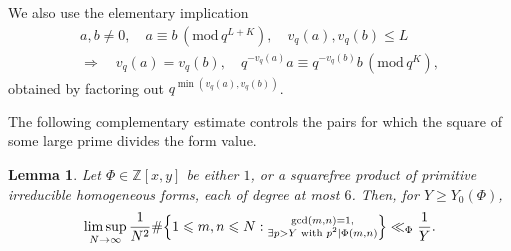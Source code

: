 \documentclass[12pt,reqno]{amsart}
\numberwithin{equation}{section}
\newtheorem{lemma}[theorem]{Lemma}
\theoremstyle{definition}
\renewcommand{\le}{\leqslant}
\renewcommand{\ge}{\geqslant}
\newcommand{\ZZ}{\mathbb{Z}}
\renewcommand{\pmod}[1]{\,(\mathrm{mod}\,#1)}
\begin{document}
We also use the elementary implication
\begin{equation}\label{eq:asy-valuations}
\begin{gathered}
a,b\ne0,\quad
a\equiv b \pmod{q^{L+K}}, \quad v_q(a),v_q(b)\le L\\
\Longrightarrow\quad
v_q(a)=v_q(b), \quad
q^{-v_q(a)}a\equiv q^{-v_q(b)}b \pmod{q^K},
\end{gathered}
\end{equation}
obtained by factoring out $q^{\min(v_q(a),v_q(b))}$.

The following complementary estimate controls the pairs for which the square of some large prime divides the form value.

\begin{lemma}\label{lem:asy-large-squares}
Let $\Phi\in \ZZ[x,y]$ be either $1$, or a squarefree product of primitive irreducible homogeneous forms, each of degree at most $6$.
Then, for $Y\ge Y_0(\Phi)$,
\[
\limsup_{N\to\infty}\frac{1}{N^2}
\#\Bigl\{1\le m,n\le N:
\substack{\gcd(m,n)=1,\\
\exists p>Y\text{ with }p^2\mid\Phi(m,n)}
\Bigr\}
\ll_\Phi \frac{1}{Y}.
\]
\end{lemma}
\end{document}
